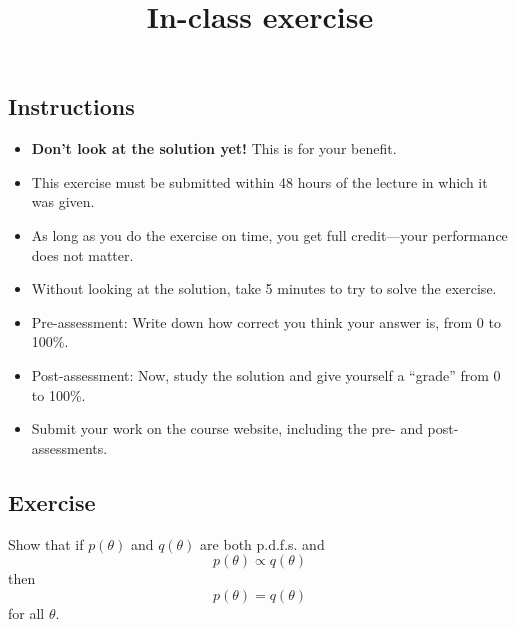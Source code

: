 \documentclass[12pt]{article}
\title{In-class exercise}
\author{}
\date{}
\begin{document}
\maketitle

\subsection*{Instructions}
\begin{itemize}
\item \textbf{Don't look at the solution yet!} This is for your benefit.
\item This exercise must be submitted within 48 hours of the lecture in which it was given. 
\item As long as you do the exercise on time, you get full credit---your performance does not matter.
\item Without looking at the solution, take 5 minutes to try to solve the exercise.
\item Pre-assessment: Write down how correct you think your answer is, from 0 to 100\%.
\item Post-assessment: Now, study the solution and give yourself a ``grade'' from 0 to 100\%.
\item Submit your work on the course website, including the pre- and post- assessments.
\end{itemize}

\subsection*{Exercise}
Show that if $p(\theta)$ and $q(\theta)$ are both p.d.f.s. and
$$p(\theta)\propto q(\theta)$$
then
$$p(\theta) = q(\theta)$$
for all $\theta$.
\end{document}
